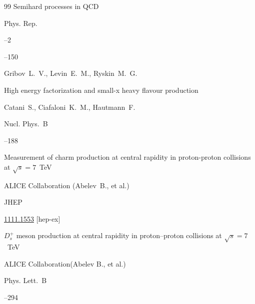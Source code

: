 \begin{thebibliography}{99}
\paper Semihard processes in QCD


\jour Phys. Rep.


--2

--150


\by  Gribov~L.~V., Levin~E.~M., Ryskin~M.~G.






\paper High energy factorization and small-x heavy flavour production

\by Catani~S., Ciafaloni~K.~M., Hautmann~F.

\jour Nucl. Phys.~B



--188






\paper Measurement of charm production at central rapidity in proton-proton collisions at $\sqrt s=7$~TeV

\by ALICE Collaboration (Abelev~B.,  et al.) 

\jour JHEP 





\arxiv \href{http://arxiv.org/abs/1111.1553}{1111.1553} [hep-ex] 







\paper $D_s^+$ meson production at central rapidity in proton–proton collisions at $\sqrt s=7$~TeV

\by  ALICE Collaboration(Abelev B., et al.)

\jour  Phys. Lett.~B



–294


\end{thebibliography}
